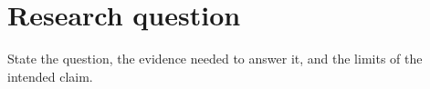 \section{Research question}
State the question, the evidence needed to answer it, and the limits of the intended claim.
